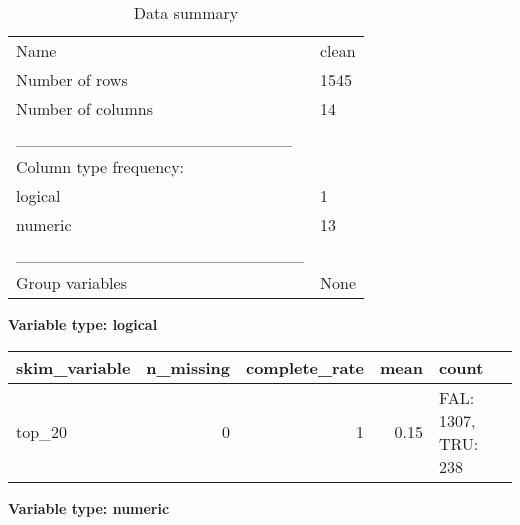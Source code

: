 \documentclass[
]{article}
\begin{document}
\begin{longtable}[]{@{}ll@{}}
\caption{Data summary}\tabularnewline
\toprule
\endhead
Name & clean \\
Number of rows & 1545 \\
Number of columns & 14 \\
\_\_\_\_\_\_\_\_\_\_\_\_\_\_\_\_\_\_\_\_\_\_\_ & \\
Column type frequency: & \\
logical & 1 \\
numeric & 13 \\
\_\_\_\_\_\_\_\_\_\_\_\_\_\_\_\_\_\_\_\_\_\_\_\_ & \\
Group variables & None \\
\bottomrule
\end{longtable}

\textbf{Variable type: logical}

\begin{longtable}[]{@{}lrrrl@{}}
\toprule
skim\_variable & n\_missing & complete\_rate & mean & count \\
\midrule
\endhead
top\_20 & 0 & 1 & 0.15 & FAL: 1307, TRU: 238 \\
\bottomrule
\end{longtable}

\textbf{Variable type: numeric}
\end{document}

